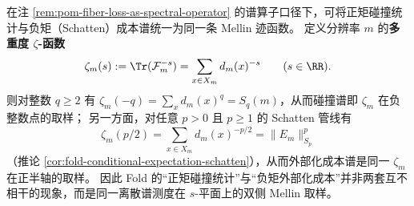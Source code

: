 \begin{remark}\label{rem:pom-multiplicity-zeta-mellin-body}
在注 \ref{rem:pom-fiber-loss-as-spectral-operator} 的谱算子口径下，可将正矩碰撞统计与负矩（Schatten）成本谱统一为同一条 Mellin 迹函数。
定义分辨率 \(m\) 的\textbf{多重度 \(\zeta\)-函数}
\[
\zeta_m(s):=\Tr(\mathcal{F}_m^{-s})=\sum_{x\in X_m} d_m(x)^{-s}\qquad(s\in\RR).
\]
则对整数 \(q\ge 2\) 有 \(\zeta_m(-q)=\sum_x d_m(x)^q=S_q(m)\)，从而碰撞谱即 \(\zeta_m\) 在负整数点的取样；
另一方面，对任意 \(p>0\) 且 \(p\ge 1\) 的 Schatten 管线有
\[
\zeta_m(p/2)=\sum_{x\in X_m}d_m(x)^{-p/2}=\|E_m\|_{S_p}^{p}
\]
（推论 \ref{cor:fold-conditional-expectation-schatten}），从而外部化成本谱是同一 \(\zeta_m\) 在正半轴的取样。
因此 Fold 的“正矩碰撞统计”与“负矩外部化成本”并非两套互不相干的现象，而是同一离散谱测度在 \(s\)-平面上的双侧 Mellin 取样。
\end{remark}

